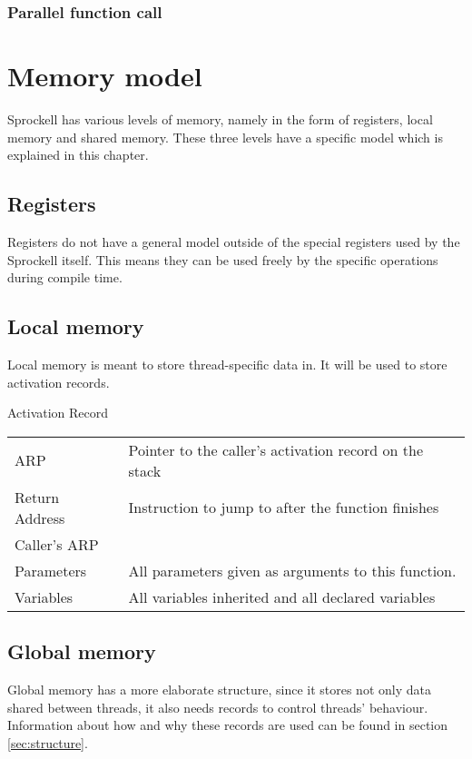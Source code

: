 \documentclass[10pt,a4paper]{report}
\begin{document}
\subsubsection{Parallel function call}






\section{Memory model}
Sprockell has various levels of memory, namely in the form of registers, local memory and shared memory. These three levels have a specific model which is explained in this chapter.

\subsection{Registers}
Registers do not have a general model outside of the special registers used by the Sprockell itself. This means they can be used freely by the specific operations during compile time.

\subsection{Local memory}
Local memory is meant to store thread-specific data in. It will be used to store activation records. 

\label{fig:actrecord}
Activation Record
 
\begin{tabular}{| l | l |}
\hline
	ARP
		& Pointer to the caller's activation record on the stack \\	

	Return Address
		& Instruction to jump to after the function finishes \\
	
	Caller's ARP 	
		& \\
	
	Parameters 
		& All parameters given as arguments to this function. \\
	
	Variables 
		& All variables inherited and all declared variables \\	
\hline
\end{tabular}

\subsection{Global memory}
Global memory has a more elaborate structure, since it stores not only data shared between threads, it also needs records to control threads' behaviour. Information about how and why these records are used can be found in section \ref{sec:structure}. 
\end{document}
